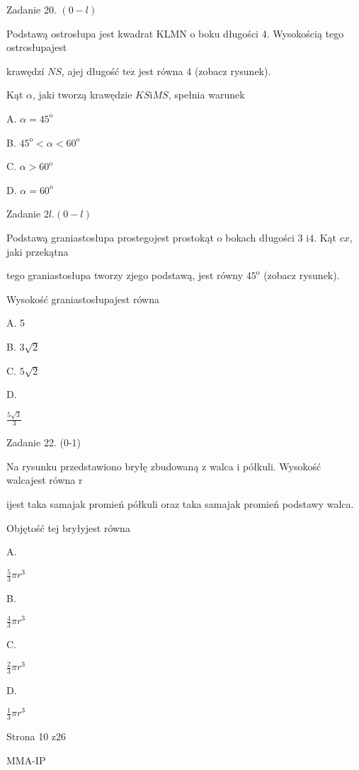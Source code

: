 \documentclass[a4paper,12pt]{article}
\begin{document}
Zadanie 20. $(0-l)$

Podstawą ostrosłupa jest kwadrat KLMN o boku długości 4. Wysokością tego ostrosłupajest

krawędzí $NS$, ajej długość $\mathrm{t}\mathrm{e}\dot{\mathrm{z}}$ jest równa 4 (zobacz rysunek).

Kąt $\alpha$, jaki tworzą krawędzie $KS\mathrm{i}MS$, spełnia warunek

A. $\alpha=45^{\mathrm{o}}$

B. $45^{\mathrm{o}}<\alpha<60^{\mathrm{o}}$

C. $\alpha>60^{\mathrm{o}}$

D. $\alpha=60^{\mathrm{o}}$

Zadanie $2l. (0-l)$

Podstawą graniastosłupa prostegojest prostokąt o bokach długości 3 $\mathrm{i}4$. Kąt $cx$, jaki przekątna

tego graniastosłupa tworzy zjego podstawą, jest równy $45^{\mathrm{o}}$ (zobacz rysunek).

Wysokość graniastosłupajest równa

A. 5

B. $3\sqrt{2}$

C. $5\sqrt{2}$

D.

$\displaystyle \frac{5\sqrt{3}}{3}$

Zadanie 22. (0-1)

Na rysunku przedstawiono bryłę zbudowaną z walca i półkuli. Wysokość walcajest równa r

ijest taka samajak promień półkuli oraz taka samajak promień podstawy walca.

Objętość tej bryłyjest równa

A.

$\displaystyle \frac{5}{3}\pi r^{3}$

B.

$\displaystyle \frac{4}{3}\pi r^{3}$

C.

$\displaystyle \frac{2}{3}\pi r^{3}$

D.

$\displaystyle \frac{1}{3}\pi r^{3}$

Strona 10 z26

MMA-IP
\end{document}
